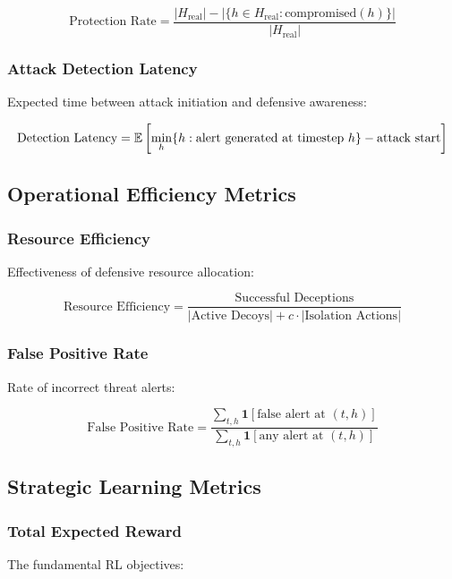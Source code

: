 \documentclass[11pt]{article}
\theoremstyle{definition}
\theoremstyle{plain}
\begin{document}
\begin{equation}
\text{Protection Rate} = \frac{|H_{\text{real}}| - |\{h \in H_{\text{real}} : \text{compromised}(h)\}|}{|H_{\text{real}}|}
\end{equation}

\subsubsection{Attack Detection Latency}
Expected time between attack initiation and defensive awareness:

\begin{equation}
\text{Detection Latency} = \mathbb{E}\left[\min_h \{h : \text{alert generated at timestep } h\} - \text{attack start}\right]
\end{equation}

\subsection{Operational Efficiency Metrics}

\subsubsection{Resource Efficiency}
Effectiveness of defensive resource allocation:

\begin{equation}
\text{Resource Efficiency} = \frac{\text{Successful Deceptions}}{|\text{Active Decoys}| + c \cdot |\text{Isolation Actions}|}
\end{equation}

\subsubsection{False Positive Rate}
Rate of incorrect threat alerts:

\begin{equation}
\text{False Positive Rate} = \frac{\sum_{t,h} \mathbf{1}[\text{false alert at } (t,h)]}{\sum_{t,h} \mathbf{1}[\text{any alert at } (t,h)]}
\end{equation}

\subsection{Strategic Learning Metrics}

\subsubsection{Total Expected Reward}
The fundamental RL objectives:
\end{document}
